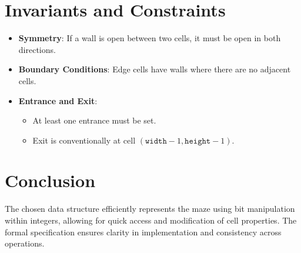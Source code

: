 \documentclass{article}
\begin{document}
\section*{Invariants and Constraints}

\begin{itemize}[noitemsep]
    \item \textbf{Symmetry}: If a wall is open between two cells, it must be open in both directions.
    \item \textbf{Boundary Conditions}: Edge cells have walls where there are no adjacent cells.
    \item \textbf{Entrance and Exit}:
    \begin{itemize}[noitemsep]
        \item At least one entrance must be set.
        \item Exit is conventionally at cell $(\texttt{width}-1, \texttt{height}-1)$.
    \end{itemize}
\end{itemize}

\section*{Conclusion}

The chosen data structure efficiently represents the maze using bit manipulation within integers, allowing for quick access and modification of cell properties. The formal specification ensures clarity in implementation and consistency across operations.
\end{document}
